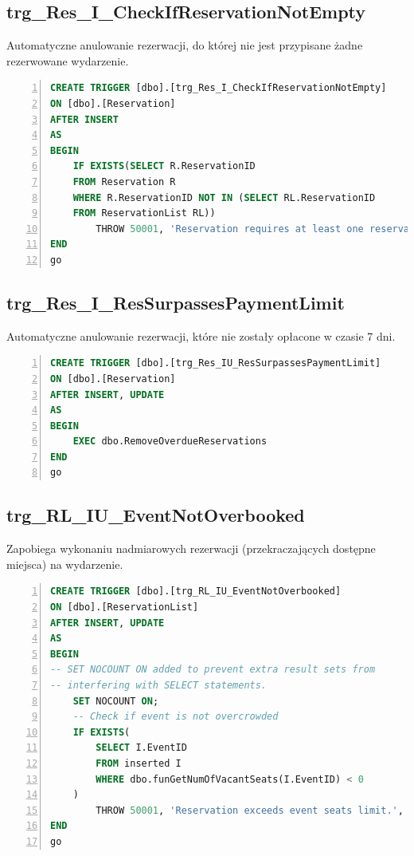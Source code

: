 \documentclass[]{article}
\begin{document}
	\subsection{trg\_Res\_I\_CheckIfReservationNotEmpty}
Automatyczne anulowanie rezerwacji, do której nie jest przypisane żadne rezerwowane wydarzenie.
\begin{lstlisting}[language=SQL,
showspaces=false,
basicstyle=\ttfamily,
numbers=left,
numberstyle=\tiny,
tabsize=2,
backgroundcolor=\color{lightg},
keywordstyle=\color{lightblue},
commentstyle=\color{gray}]
CREATE TRIGGER [dbo].[trg_Res_I_CheckIfReservationNotEmpty]
ON [dbo].[Reservation]
AFTER INSERT
AS
BEGIN
	IF EXISTS(SELECT R.ReservationID
	FROM Reservation R
	WHERE R.ReservationID NOT IN (SELECT RL.ReservationID
	FROM ReservationList RL))
		THROW 50001, 'Reservation requires at least one reservation list.', 1
END
go
\end{lstlisting}

	\subsection{trg\_Res\_I\_ResSurpassesPaymentLimit}
Automatyczne anulowanie rezerwacji, które nie zostały opłacone w czasie 7 dni.
\begin{lstlisting}[language=SQL,
showspaces=false,
basicstyle=\ttfamily,
numbers=left,
numberstyle=\tiny,
tabsize=2,
backgroundcolor=\color{lightg},
keywordstyle=\color{lightblue},
commentstyle=\color{gray}]
CREATE TRIGGER [dbo].[trg_Res_IU_ResSurpassesPaymentLimit]
ON [dbo].[Reservation]
AFTER INSERT, UPDATE
AS
BEGIN
	EXEC dbo.RemoveOverdueReservations	   
END
go
\end{lstlisting}

	\subsection{trg\_RL\_IU\_EventNotOverbooked}
Zapobiega wykonaniu nadmiarowych rezerwacji (przekraczających dostępne miejsca) na wydarzenie.
\begin{lstlisting}[language=SQL,
showspaces=false,
basicstyle=\ttfamily,
numbers=left,
numberstyle=\tiny,
tabsize=2,
backgroundcolor=\color{lightg},
keywordstyle=\color{lightblue},
commentstyle=\color{gray}]
CREATE TRIGGER [dbo].[trg_RL_IU_EventNotOverbooked]
ON [dbo].[ReservationList]
AFTER INSERT, UPDATE
AS
BEGIN
-- SET NOCOUNT ON added to prevent extra result sets from
-- interfering with SELECT statements.
	SET NOCOUNT ON;
	-- Check if event is not overcrowded
	IF EXISTS(
		SELECT I.EventID
		FROM inserted I
		WHERE dbo.funGetNumOfVacantSeats(I.EventID) < 0
	)
		THROW 50001, 'Reservation exceeds event seats limit.', 1
END
go

\end{lstlisting}
\end{document}
